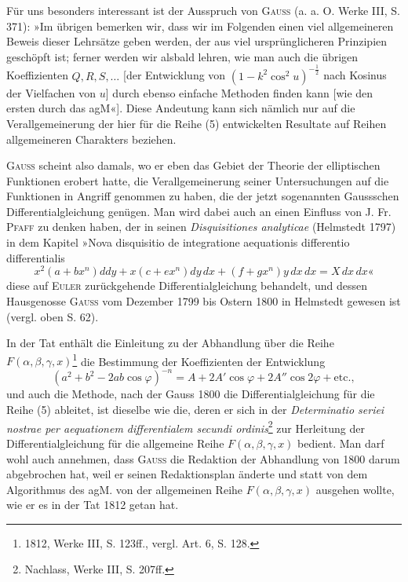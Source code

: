 Für uns besonders interessant ist der Ausspruch von \textsc{Gauss} (a. a. O.
Werke III, S. 371): »Im übrigen bemerken wir, dass wir im Folgenden einen
viel allgemeineren Beweis dieser Lehrsätze geben werden, der aus viel ursprünglicheren
Prinzipien geschöpft ist; ferner werden wir alsbald lehren,
wie man auch die übrigen Koeffizienten \(Q,R,S,\ldots\) [der Entwicklung von
\((1-k^2\cos^2u)^{-\frac12}\) nach Kosinus der Vielfachen von \(u\)] durch ebenso einfache
Methoden finden kann [wie den ersten durch das agM«]. Diese Andeutung
kann sich nämlich nur auf die Verallgemeinerung der hier für die Reihe (5)
entwickelten Resultate auf Reihen allgemeineren Charakters beziehen.

\textsc{Gauss} scheint also damals, wo er eben das Gebiet der Theorie der elliptischen
Funktionen erobert hatte, die Verallgemeinerung seiner Untersuchungen
auf die Funktionen in Angriff genommen zu haben, die der jetzt sogenannten
Gaussschen Differentialgleichung genügen. Man wird dabei auch an einen
Einfluss von J. Fr. \textsc{Pfaff} zu denken haben, der in seinen \textit{Disquisitiones analyticae}
(Helmstedt 1797) in dem Kapitel »Nova disquisitio de integratione
aequationis differentio differentialis
\[
x^2(a+bx^n)ddy+x(c+ex^n)dy\,dx+(f+gx^n)y\,dx\,dx=X\,dx\,dx\text{«}
\]
\noindent diese auf \textsc{Euler} zurückgehende Differentialgleichung behandelt, und dessen
Hausgenosse \textsc{Gauss} vom Dezember 1799 bis Ostern 1800 in Helmstedt gewesen
ist (vergl. oben S. 62).\par
\clearpage{}
\HistoricalFoot{}{12\textsuperscript{\(\ast\)}}
\indent In der Tat enthält die Einleitung zu der Abhandlung über die Reihe
\(F(\alpha,\beta,\gamma,x)\)\footnote{1812, Werke III, S. 123ff., vergl. Art. 6, S. 128.} die Bestimmung der Koeffizienten der Entwicklung
\[
(a^2+b^2-2ab\cos\varphi)^{-n}=A+2A'\cos\varphi+2A''\cos2\varphi+\mathrm{etc.},
\]
\noindent und auch die Methode, nach der Gauss 1800 die Differentialgleichung für
die Reihe (5) ableitet, ist dieselbe wie die, deren er sich in der \textit{Determinatio
seriei nostrae per aequationem differentialem secundi ordinis}\footnote{Nachlass, Werke III, S. 207ff.} zur Herleitung der
Differentialgleichung für die allgemeine Reihe \(F(\alpha,\beta,\gamma,x)\) bedient. Man darf
wohl auch annehmen, dass \textsc{Gauss} die Redaktion der Abhandlung von 1800
darum abgebrochen hat, weil er seinen Redaktionsplan änderte und statt von
dem Algorithmus des agM. von der allgemeinen Reihe \(F(\alpha,\beta,\gamma,x)\) ausgehen
wollte, wie er es in der Tat 1812 getan hat.

